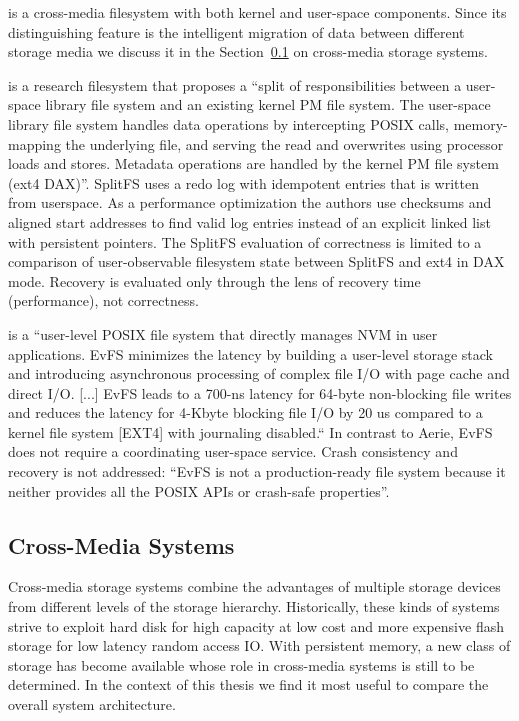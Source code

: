 \documentclass[12pt,a4paper,twoside]{book}
\begin{document}
 is a cross-media filesystem with both kernel and user-space components.
Since its distinguishing feature is the intelligent migration of data between different storage media we discuss it in the Section~\ref{sec:cross_media_storage_systems} on cross-media storage systems.

 is a research filesystem that proposes a
“split of responsibilities between a user-space library file system and an existing kernel PM file system.
The user-space library file system handles data operations by intercepting POSIX calls, memory-mapping the underlying file, and serving the read and overwrites using processor loads and stores.
Metadata operations are handled by the kernel PM file system (ext4 DAX)”.
SplitFS uses a redo log with idempotent entries that is written from userspace.
As a performance optimization the authors use checksums and aligned start addresses to find valid log entries instead of an explicit linked list with persistent pointers.
The SplitFS evaluation of correctness is limited to a comparison of user-observable filesystem state between SplitFS and ext4 in DAX mode.
Recovery is evaluated only through the lens of recovery time (performance), not correctness.

 is a
“user-level POSIX file system that directly manages NVM in user applications.
EvFS minimizes the latency by building a user-level storage stack and introducing asynchronous processing of complex file I/O with page cache and direct I/O.
[...]
EvFS leads to a 700-ns latency for 64-byte non-blocking file writes and reduces the latency for 4-Kbyte blocking file I/O by 20 us compared to a kernel file system [EXT4] with journaling disabled.“
In contrast to Aerie, EvFS does not require a coordinating user-space service.
Crash consistency and recovery is not addressed:
“EvFS is not a production-ready file system because it neither provides all the POSIX APIs or crash-safe properties”.

\subsection{Cross-Media Systems}\label{sec:cross_media_storage_systems}
Cross-media storage systems combine the advantages of multiple storage devices from different levels of the storage hierarchy.
Historically, these kinds of systems strive to exploit hard disk for high capacity at low cost and more expensive flash storage for low latency random access IO.
With persistent memory, a new class of storage has become available whose role in cross-media systems is still to be determined.
In the context of this thesis we find it most useful to compare the overall system architecture.
\end{document}
